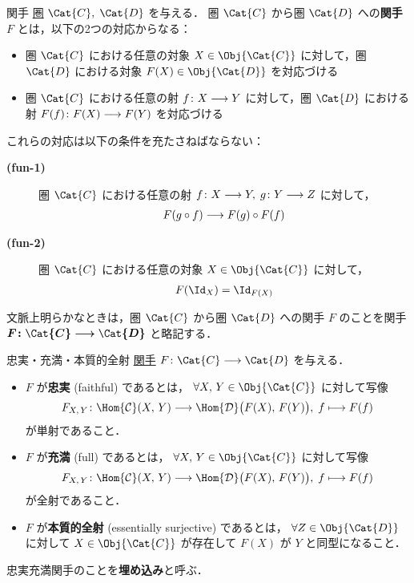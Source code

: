 \documentclass[TQFT_main]{subfiles}
\begin{document}
\begin{mydef}[label=def:functor]{関手}
    \hyperref[def:category]{圏} $\Cat{C},\; \Cat{D}$ を与える．
    圏 $\Cat{C}$ から圏 $\Cat{D}$ への\textbf{関手} $F$ とは，以下の2つの対応からなる：
    \begin{itemize}
        \item 圏 $\Cat{C}$ における任意の対象 $X \in \Obj{\Cat{C}}$ に対して，圏 $\Cat{D}$ における対象 $F(X) \in \Obj{\Cat{D}}$ を対応づける
        \item 圏 $\Cat{C}$ における任意の射 $f \colon X \longrightarrow Y$ に対して，圏 $\Cat{D}$ における射 $F(f) \colon F(X) \longrightarrow F(Y)$ を対応づける
    \end{itemize}
    これらの対応は以下の条件を充たさねばならない：
    \begin{description}
        \item[\textbf{(fun-1)}]  圏 $\Cat{C}$ における任意の射 $f \colon X \longrightarrow Y,\; g \colon Y \longrightarrow Z$ に対して，
        \begin{align}
            F(g \circ f) \longrightarrow F(g) \circ F(f)
        \end{align}
        \item[\textbf{(fun-2)}]  圏 $\Cat{C}$ における任意の対象 $X \in \Obj{\Cat{C}}$ に対して，
        \begin{align}
            F (\Id_{X}) = \Id_{F(X)}
        \end{align}
    \end{description}
    
    \tcblower

    文脈上明らかなときは，圏 $\Cat{C}$ から圏 $\Cat{D}$ への関手 $F$ のことを関手 $\bm{F \colon \Cat{C} \lto \Cat{D}}$ と略記する．
\end{mydef}

\begin{mydef}[label=def:faithful]{忠実・充満・本質的全射}
    \hyperref[def:functor]{関手} $F \colon \Cat{C} \longrightarrow \Cat{D}$ を与える．
    \begin{itemize}
        \item $F$ が\textbf{忠実} (faithful) であるとは， $\forall X,\,Y \in \Obj{\Cat{C}}$ に対して写像
        \begin{align}
            F_{X,\, Y} \colon \Hom{\mathcal{C}}(X,\, Y) \longrightarrow \Hom{\mathcal{D}} \bigl( F(X),\, F(Y) \bigr),\; f \longmapsto F(f)
        \end{align}
        が単射であること．
        \item $F$ が\textbf{充満} (full) であるとは， $\forall X,\,Y \in \Obj{\Cat{C}}$ に対して写像
        \begin{align}
            F_{X,\, Y} \colon \Hom{\mathcal{C}}(X,\, Y) \longrightarrow \Hom{\mathcal{D}} \bigl( F(X),\, F(Y) \bigr),\; f \longmapsto F(f)
        \end{align}
        が全射であること．
        \item $F$ が\textbf{本質的全射} (essentially surjective) であるとは， $\forall Z \in \Obj{\Cat{D}}$ に対して $X \in \Obj{\Cat{C}}$ が存在して $F(X)$ が $Y$ と同型になること．
    \end{itemize}
    忠実充満関手のことを\textbf{埋め込み}と呼ぶ．
\end{mydef}
\end{document}
